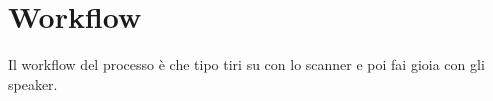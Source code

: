 \section{Workflow}

Il workflow del processo \`e che tipo tiri su con lo scanner
e poi fai gioia con gli speaker.
